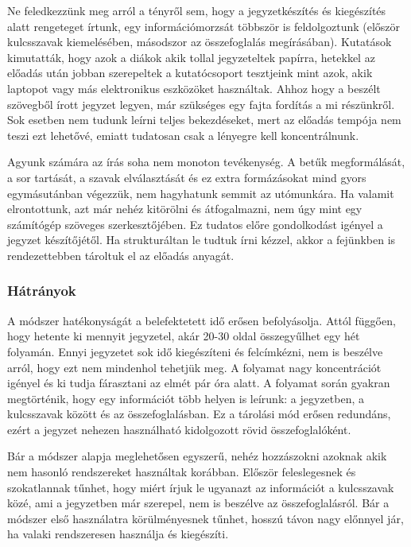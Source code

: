 \documentclass[../Main.tex]{subfiles}
\begin{document}
Ne feledkezzünk meg arról a tényről sem, hogy a jegyzetkészítés és kiegészítés alatt
rengeteget írtunk, egy információmorzsát többször is feldolgoztunk (először kulcsszavak
kiemelésében, másodszor az összefoglalás megírásában). Kutatások kimutatták, hogy azok
a diákok akik tollal jegyzeteltek papírra, hetekkel az előadás után jobban szerepeltek a
kutatócsoport tesztjeink mint azok, akik laptopot vagy más elektronikus eszközöket
használtak. Ahhoz hogy a beszélt szövegből írott jegyzet legyen, már szükséges egy fajta
fordítás a mi részünkről. Sok esetben nem tudunk leírni teljes bekezdéseket, mert az
előadás tempója nem teszi ezt lehetővé, emiatt tudatosan csak a lényegre kell
koncentrálnunk.

Agyunk számára az írás soha nem monoton tevékenység. A betűk megformálását, a sor
tartását, a szavak elválasztását és ez extra formázásokat mind gyors egymásutánban
végezzük, nem hagyhatunk semmit az utómunkára. Ha valamit elrontottunk, azt már
nehéz kitörölni és átfogalmazni, nem úgy mint egy számítógép szöveges szerkesztőjében.
Ez tudatos előre gondolkodást igényel a jegyzet készítőjétől. Ha strukturáltan le tudtuk
írni kézzel, akkor a fejünkben is rendezettebben tároltuk el az előadás anyagát.


\subsubsection{Hátrányok}


    A módszer hatékonyságát a belefektetett idő erősen befolyásolja. Attól függően, hogy
hetente ki mennyit jegyzetel, akár 20-30 oldal összegyűlhet egy hét folyamán. Ennyi
jegyzetet sok idő kiegészíteni és felcímkézni, nem is beszélve arról, hogy ezt nem
mindenhol tehetjük meg. A folyamat nagy koncentrációt igényel és ki tudja fárasztani az
elmét pár óra alatt. A folyamat során gyakran megtörténik, hogy egy információt több
helyen is leírunk: a jegyzetben, a kulcsszavak között és az összefoglalásban. Ez a tárolási
mód erősen redundáns, ezért a jegyzet nehezen használható kidolgozott rövid
összefoglalóként.

Bár a módszer alapja meglehetősen egyszerű, nehéz hozzászokni azoknak akik nem
hasonló rendszereket használtak korábban. Először feleslegesnek és szokatlannak tűnhet,
hogy miért írjuk le ugyanazt az információt a kulcsszavak közé, ami a jegyzetben már
szerepel, nem is beszélve az összefoglalásról. Bár a módszer első használatra
körülményesnek tűnhet, hosszú távon nagy előnnyel jár, ha valaki rendszeresen használja
és kiegészíti.
\end{document}
